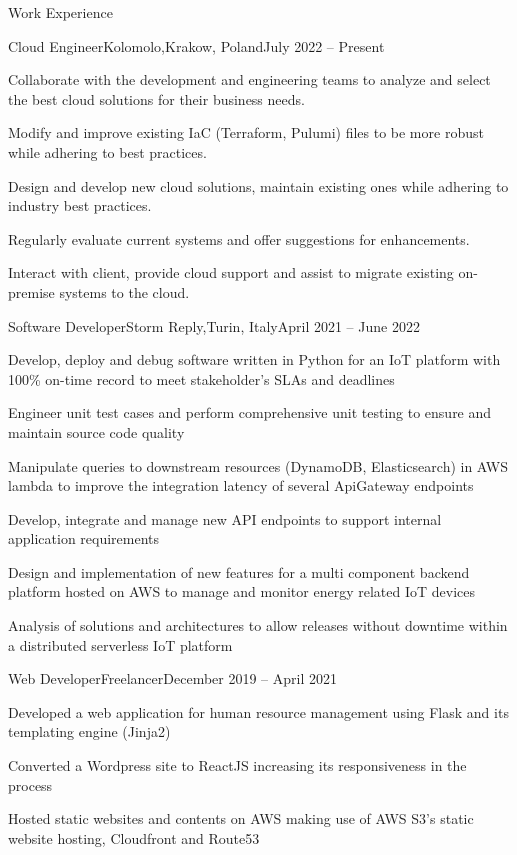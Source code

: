 \documentclass[a4paper]{article}
\newlength{\tabin}
\newlength{\secsep}
\newcommand{\lineunder}{\vspace*{-8pt}\\\hspace*{-6pt}\hrulefill\\\vspace*{-15pt}}
\newenvironment{tabbedsection}[1]{
  \begin{list}{}{
    \setlength{\itemsep}{0pt}
    \setlength{\labelsep}{0pt}
    \setlength{\labelwidth}{0pt}
    \setlength{\leftmargin}{\tabin}
    \setlength{\rightmargin}{\tabin}
    \setlength{\listparindent}{0pt}
    \setlength{\parsep}{0pt}
    \setlength{\parskip}{0pt}
    \setlength{\partopsep}{0pt}
    \setlength{\topsep}{#1}
  }
  \item[]
}{\end{list}}
\newenvironment{resume_section}[1]{
  \filbreak
  \vspace{2\secsep}
  \textsc{\large#1}
  \lineunder
  \begin{tabbedsection}{\secsep}
}{\end{tabbedsection}}
\newenvironment{subitems}{
  \renewcommand{\labelitemi}{-}
  \begin{itemize}
  \setlength{\labelsep}{1em}
}{\end{itemize}}
\newenvironment{resume_employer}[4]{
  \vspace{\secsep}
  \textbf{#1 \hfill #4} \\ 
  \textit{\small #2 #3}
  \begin{tabbedsection}{0pt}
  \begin{subitems}
}{\end{subitems}\end{tabbedsection}}
\begin{document}
\begin{resume_section}{Work Experience}
  \begin{resume_employer}{Cloud Engineer}{Kolomolo,}{Krakow, Poland}{July 2022 -- Present}
    \item Collaborate with the development and engineering teams to analyze and select the best cloud solutions for their business needs.
    \item Modify and improve existing IaC (Terraform, Pulumi) files to be more robust while adhering to best practices.
    \item Design and develop new cloud solutions, maintain existing ones while adhering to industry best practices.
    \item Regularly evaluate current systems and offer suggestions for enhancements.
    \item Interact with client, provide cloud support and assist to migrate existing on-premise systems to the cloud.
  \end{resume_employer}

  \begin{resume_employer}{Software Developer}{Storm Reply,}{Turin, Italy}{April 2021 -- June 2022}
    \item Develop, deploy and debug software written in Python for an IoT platform with 100\% on-time record to meet stakeholder's SLAs and deadlines
    \item Engineer unit test cases and perform comprehensive unit testing to ensure and maintain source code quality
    \item Manipulate queries to downstream resources (DynamoDB, Elasticsearch) in AWS lambda to improve the integration latency of several ApiGateway endpoints
    \item Develop, integrate and manage new API endpoints to support internal application requirements
    \item Design and implementation of new features for a multi component backend platform hosted on AWS to manage and monitor energy related IoT devices
    \item Analysis of solutions and architectures to allow releases without downtime within a distributed serverless IoT platform
  \end{resume_employer}

  \begin{resume_employer}{Web Developer}{Freelancer}{}{December 2019 -- April 2021}
    \item Developed a web application for human resource management using Flask and its templating engine (Jinja2)
    \item Converted a Wordpress site to ReactJS increasing its responsiveness in the process
    \item Hosted static websites and contents on AWS making use of AWS S3's static website hosting, Cloudfront and Route53
  \end{resume_employer}
\end{resume_section}
\end{document}
